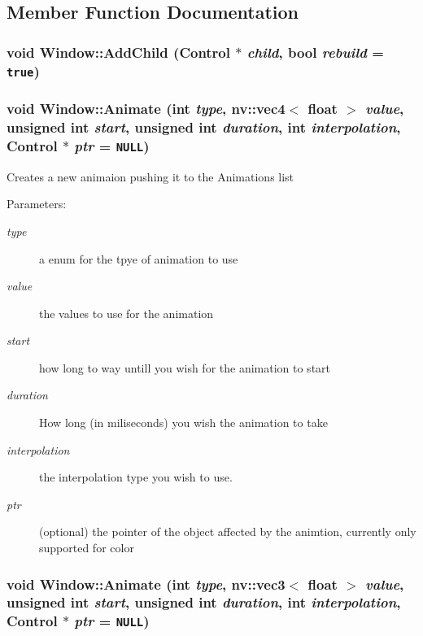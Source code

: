 \subsection{Member Function Documentation}
\hypertarget{class_window_9aad0f28578feb9939ba854c798cfee3}{
\subsubsection[{AddChild}]{\setlength{\rightskip}{0pt plus 5cm}void Window::AddChild ({\bf Control} $\ast$ {\em child}, \/  bool {\em rebuild} = {\tt true})}}
\label{class_window_9aad0f28578feb9939ba854c798cfee3}


\hypertarget{class_window_cafe750f45667f2e81b8423fb496b459}{
\subsubsection[{Animate}]{\setlength{\rightskip}{0pt plus 5cm}void Window::Animate (int {\em type}, \/  {\bf nv::vec4}$<$ float $>$ {\em value}, \/  unsigned int {\em start}, \/  unsigned int {\em duration}, \/  int {\em interpolation}, \/  {\bf Control} $\ast$ {\em ptr} = {\tt NULL})}}
\label{class_window_cafe750f45667f2e81b8423fb496b459}


Creates a new animaion pushing it to the Animations list \begin{Desc}
\item[Parameters:]
\begin{description}
\item[{\em type}]a enum for the tpye of animation to use \item[{\em value}]the values to use for the animation \item[{\em start}]how long to way untill you wish for the animation to start \item[{\em duration}]How long (in miliseconds) you wish the animation to take \item[{\em interpolation}]the interpolation type you wish to use. \item[{\em ptr}](optional) the pointer of the object affected by the animtion, currently only supported for color \end{description}
\end{Desc}
\hypertarget{class_window_80c7299c30b007e41e149ca707b14ebe}{
\subsubsection[{Animate}]{\setlength{\rightskip}{0pt plus 5cm}void Window::Animate (int {\em type}, \/  {\bf nv::vec3}$<$ float $>$ {\em value}, \/  unsigned int {\em start}, \/  unsigned int {\em duration}, \/  int {\em interpolation}, \/  {\bf Control} $\ast$ {\em ptr} = {\tt NULL})}}
\label{class_window_80c7299c30b007e41e149ca707b14ebe}


